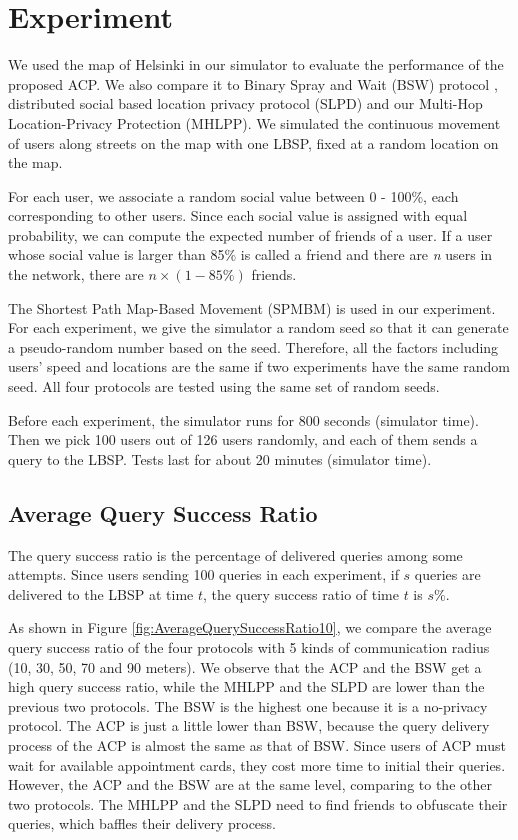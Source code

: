 
\section{ Experiment}

\noindent We used the map of Helsinki in our simulator to evaluate the performance of the proposed ACP. We also compare it to Binary Spray and Wait (BSW) protocol \cite{C31}, distributed social based location privacy protocol (SLPD) \cite{C16} and our Multi-Hop Location-Privacy Protection (MHLPP). We simulated the continuous movement of users along streets on the map with one LBSP, fixed at a random location on the map.

For each user, we associate a random social value between 0 - 100\%, each corresponding to other users. Since each social value is assigned with equal probability, we can compute the expected number of friends of a user. If a user whose social value is larger than 85\% is called a friend and there are \textit{n} users in the network, there are $n\times \left(1-85\%\right)$ friends.

The Shortest Path Map-Based Movement (SPMBM) \cite{C35} is used in our experiment. For each experiment, we give the simulator a random seed so that it can generate a pseudo-random number based on the seed. Therefore, all the factors including users' speed and locations are the same if two experiments have the same random seed. All four protocols are tested using the same set of random seeds.

Before each experiment, the simulator runs for 800 seconds (simulator time). Then we pick 100 users out of 126 users randomly, and each of them sends a query to the LBSP. Tests last for about 20 minutes (simulator time). 


\subsection{  Average Query Success Ratio}

\noindent The query success ratio is the percentage of delivered queries among some attempts. Since users sending 100 queries in each experiment, if $s$ queries are delivered to the LBSP at time $t$, the query success ratio of time $t$ is $s\%$.

As shown in Figure \ref{fig:AverageQuerySuccessRatio10}, we compare the average query success ratio of the four protocols with 5 kinds of communication radius (10, 30, 50, 70 and 90 meters). We observe that the ACP and the BSW get a high query success ratio, while the MHLPP and the SLPD are lower than the previous two protocols. The BSW is the highest one because it is a no-privacy protocol. The ACP is just a little lower than BSW, because the query delivery process of the ACP is almost the same as that of BSW. Since users of ACP must wait for available appointment cards, they cost more time to initial their queries. However, the ACP and the BSW are at the same level, comparing to the other two protocols. The MHLPP and the SLPD need to find friends to obfuscate their queries, which baffles their delivery process.

